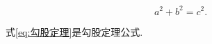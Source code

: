 \documentclass[12pt,a4paper,oneside]{ctexart}
\begin{document}
\begin{equation}
    \label{eq:勾股定理}
    a^2+b^2=c^2.
\end{equation}

式\eqref{eq:勾股定理}是勾股定理公式.
\end{document}
